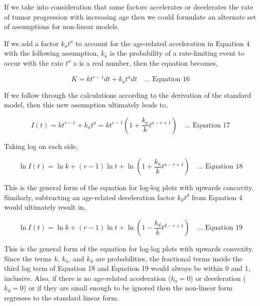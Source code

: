\documentclass[lineno,sn-basic, Numbered]{sn-jnl}%
\theoremstyle{thmstyleone}%
\theoremstyle{thmstyletwo}%
\theoremstyle{thmstylethree}%
\begin{document}
If we take into consideration that some factors accelerates or decelerates the rate of tumor progression with increasing age then we could formulate an alternate set of assumptions for non-linear models.

If we add a factor \( k_a t^a \) to account for the age-related acceleration in Equation 4 with the following assumption, \( k_a \) is the probability of a rate-limiting event to occur with the rate \( t^a \) a is a real number, then the equation becomes,

\[ K = k t^{r-1} dt + k_a t^{a} dt \quad \text{... Equation 16} \]

If we follow through the calculations according to the derivation of the standard model, then this new assumption ultimately leads to,

\[ I(t) = k t^{r-1} + k_a t^{a} = k t^{r-1} \left( 1 + \frac{k_a}{k} t^{a-r+1} \right) \quad \text{... Equation 17} \]

Taking log on each side,

\[ \ln I(t) = \ln k + (r - 1) \ln t + \ln \left( 1 + \frac{k_a}{k} t^{a-r+1} \right) \quad \text{... Equation 18} \]

This is the general form of the equation for log-log plots with upwards concavity. Similarly, subtracting an age-related deceleration factor \( k_d t^d \) from Equation 4 would ultimately result in,

\[ \ln I(t) = \ln k + (r - 1) \ln t + \ln \left( 1 - \frac{k_d}{k} t^{d-r+1} \right) \quad \text{... Equation 19} \]

This is the general form of the equation for log-log plots with upwards convexity. Since the terms \( k \), \( k_a \), and \( k_d \) are probabilities, the fractional terms inside the third log term of Equation 18 and Equation 19 would always be within 0 and 1, inclusive. Also, if there is no age-related acceleration (\( k_a = 0 \)) or deceleration (\( k_d = 0 \)) or if they are small enough to be ignored then the non-linear form regresses to the standard linear form.



\end{document}
